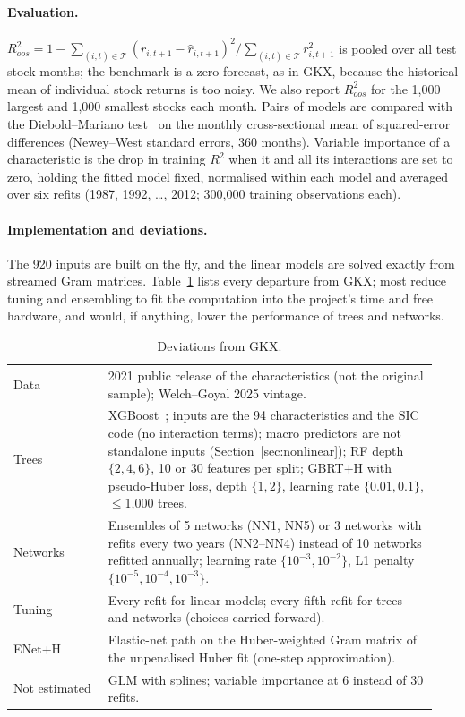 \documentclass[10pt]{article}
\begin{document}
\paragraph{Evaluation.} $R^2_{oos}=1-\sum_{(i,t)\in\mathcal T}(r_{i,t+1}-\hat r_{i,t+1})^2/\sum_{(i,t)\in\mathcal T}r_{i,t+1}^2$
is pooled over all test stock-months; the benchmark is a zero forecast, as in GKX, because the historical mean of
individual stock returns is too noisy. We also report $R^2_{oos}$ for the 1,000 largest and 1,000 smallest stocks each month.
Pairs of models are compared with the Diebold--Mariano test~\cite{dm} on the monthly cross-sectional mean of squared-error
differences (Newey--West standard errors, 360 months). Variable importance of a characteristic is the drop in training
$R^2$ when it and all its interactions are set to zero, holding the fitted model fixed, normalised within each model and
averaged over six refits (1987, 1992, \dots, 2012; 300{,}000 training observations each).

\paragraph{Implementation and deviations.} The 920 inputs are built on the fly, and the linear models are solved exactly
from streamed Gram matrices. Table~\ref{tab:dev} lists every departure from GKX; most reduce tuning and ensembling to fit
the computation into the project's time and free hardware, and would, if anything, lower the performance of trees and
networks.

\begin{table}[t]\centering\small
\caption{Deviations from GKX.}\label{tab:dev}
\begin{tabular}{p{0.21\linewidth}p{0.73\linewidth}}\toprule
Data & 2021 public release of the characteristics (not the original sample); Welch--Goyal 2025 vintage. \\
Trees & XGBoost~\cite{xgb}; inputs are the 94 characteristics and the SIC code (no interaction terms); macro predictors are
not standalone inputs (Section~\ref{sec:nonlinear}); RF depth $\{2,4,6\}$, 10 or 30 features per split; GBRT+H with
pseudo-Huber loss, depth $\{1,2\}$, learning rate $\{0.01,0.1\}$, $\le$1{,}000 trees. \\
Networks & Ensembles of 5 networks (NN1, NN5) or 3 networks with refits every two years (NN2--NN4) instead of 10 networks
refitted annually; learning rate $\{10^{-3},10^{-2}\}$, L1 penalty $\{10^{-5},10^{-4},10^{-3}\}$. \\
Tuning & Every refit for linear models; every fifth refit for trees and networks (choices carried forward). \\
ENet+H & Elastic-net path on the Huber-weighted Gram matrix of the unpenalised Huber fit (one-step approximation). \\
Not estimated & GLM with splines; variable importance at 6 instead of 30 refits. \\
\bottomrule\end{tabular}
\end{table}
\end{document}
